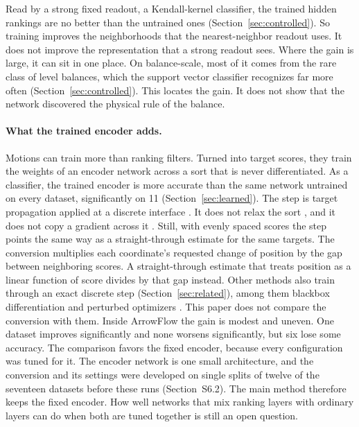 Read by a strong fixed readout, a Kendall-kernel classifier, the trained hidden rankings are no better than the untrained ones (Section~\ref{sec:controlled}). So training improves the neighborhoods that the nearest-neighbor readout uses. It does not improve the representation that a strong readout sees. Where the gain is large, it can sit in one place. On balance-scale, most of it comes from the rare class of level balances, which the support vector classifier recognizes far more often (Section~\ref{sec:controlled}). This locates the gain. It does not show that the network discovered the physical rule of the balance.

\paragraph{What the trained encoder adds.}
Motions can train more than ranking filters. Turned into target scores, they train the weights of an encoder network across a sort that is never differentiated. As a classifier, the trained encoder is more accurate than the same network untrained on every dataset, significantly on 11 (Section~\ref{sec:learned}). The step is target propagation applied at a discrete interface \citep{bengio2014auto,lee2015difference,friesen2018combinatorial}. It does not relax the sort \citep{grover2019neuralsort,blondel2020fast}, and it does not copy a gradient across it \citep{bengio2013estimating}. Still, with evenly spaced scores the step points the same way as a straight-through estimate for the same targets. The conversion multiplies each coordinate's requested change of position by the gap between neighboring scores. A straight-through estimate that treats position as a linear function of score divides by that gap instead. Other methods also train through an exact discrete step (Section~\ref{sec:related}), among them blackbox differentiation \citep{vlastelica2020differentiation,rolinek2020optimizing} and perturbed optimizers \citep{berthet2020perturbed}. This paper does not compare the conversion with them. Inside ArrowFlow the gain is modest and uneven. One dataset improves significantly and none worsens significantly, but six lose some accuracy. The comparison favors the fixed encoder, because every configuration was tuned for it. The encoder network is one small architecture, and the conversion and its settings were developed on single splits of twelve of the seventeen datasets before these runs (Section~S6.2). The main method therefore keeps the fixed encoder. How well networks that mix ranking layers with ordinary layers can do when both are tuned together is still an open question.


